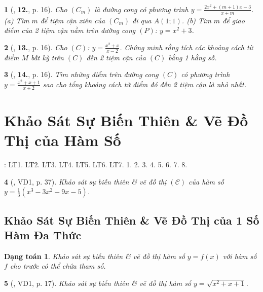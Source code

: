 \documentclass{article}
\newtheorem{baitoan}{}
\newtheorem{dangtoan}{Dạng toán}
\begin{document}
\begin{baitoan}[\cite{TLCT_giai_tich_12}, \textbf{12.}, p. 16]
	Cho $(C_m)$ là đường cong có phương trình $y = \frac{2x^2 + (m + 1)x - 3}{x + m}$. (a) Tìm $m$ để tiệm cận xiên của $(C_m)$ đi qua $A(1;1)$. (b) Tìm $m$ để giao điểm của 2 tiệm cận nằm trên đường cong $(P)$: $y = x^2 + 3$.	
\end{baitoan}

\begin{baitoan}[\cite{TLCT_giai_tich_12}, \textbf{13.}, p. 16]
	Cho $(C)$: $y = \frac{x^2 + x}{x - 2}$. Chứng minh rằng tích các khoảng cách từ điểm $M$ bất kỳ trên $(C)$ đến 2 tiệm cận của $(C)$ bằng 1 hằng số.
\end{baitoan}

\begin{baitoan}[\cite{TLCT_giai_tich_12}, \textbf{14.}, p. 16]
	Tìm những điểm trên đường cong $(C)$ có phương trình $y = \frac{x^2 + x + 1}{x + 2}$ sao cho tổng khoảng cách từ điểm đó đến 2 tiệm cận là nhỏ nhất.
\end{baitoan}


\section{Khảo Sát Sự Biến Thiên \& Vẽ Đồ Thị của Hàm Số}
\cite[Chap. I, \S4, pp. 28--44]{SGK_Toan_12_Canh_Dieu_tap_1}: LT1. LT2. LT3. LT4. LT5. LT6. LT7. 1. 2. 3. 4. 5. 6. 7. 8.

\begin{baitoan}[\cite{SGK_Toan_12_giai_tich_nang_cao}, VD1, p. 37]
	Khảo sát sự biến thiên \& vẽ đồ thị $(\mathcal{C})$ của hàm số $y = \frac{1}{3}(x^3 - 3x^2 - 9x - 5)$.
\end{baitoan}

\subsection{Khảo Sát Sự Biến Thiên \& Vẽ Đồ Thị của 1 Số Hàm Đa Thức}

\begin{dangtoan}
	Khảo sát sự biến thiên \& vẽ đồ thị hàm số $y = f(x)$ với hàm số $f$ cho trước có thể chứa tham số.
\end{dangtoan}

\begin{baitoan}[\cite{TLCT_giai_tich_12}, VD1, p. 17]
	Khảo sát sự biến thiên \& vẽ đồ thị hàm số $y = \sqrt{x^2 + x + 1}$.
\end{baitoan}
\end{document}
